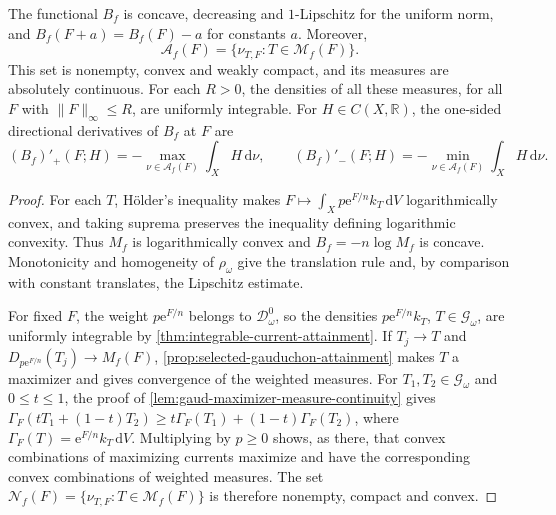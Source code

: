 \begin{proposition}\label{prop:integrable-threshold-adjoints}
The functional $B_f$ is concave, decreasing and $1$-Lipschitz for the uniform norm, and $B_f(F+a)=B_f(F)-a$ for constants $a$. Moreover,
\[
 \mathcal A_f(F)=\{\nu_{T,F}:T\in\mathscr M_f(F)\}.
\]
This set is nonempty, convex and weakly compact, and its measures are absolutely continuous. For each $R>0$, the densities of all these measures, for all $F$ with $\|F\|_\infty\leq R$, are uniformly integrable. For $H\in C(X,\mathbb R)$, the one-sided directional derivatives of $B_f$ at $F$ are
\[
 (B_f)'_+(F;H)=-\max_{\nu\in\mathcal A_f(F)}\int_XH\,\mathrm{d}\nu,
 \qquad
 (B_f)'_-(F;H)=-\min_{\nu\in\mathcal A_f(F)}\int_XH\,\mathrm{d}\nu.
\]
\end{proposition}
\begin{proof}
For each $T$, H\"older's inequality makes $F\mapsto\int_Xp \mathrm{e}^{F/n}k_T\,\mathrm{d}V$ logarithmically convex, and taking suprema preserves the inequality defining logarithmic convexity. Thus $M_f$ is logarithmically convex and $B_f=-n\log M_f$ is concave. Monotonicity and homogeneity of $\rho_\omega$ give the translation rule and, by comparison with constant translates, the Lipschitz estimate.

For fixed $F$, the weight $p\mathrm{e}^{F/n}$ belongs to $\mathcal D_\omega^0$, so the densities $p\mathrm{e}^{F/n}k_T$, $T\in\mathscr G_\omega$, are uniformly integrable by \cref{thm:integrable-current-attainment}. If $T_j\to T$ and $D_{p\mathrm{e}^{F/n}}(T_j)\to M_f(F)$, \cref{prop:selected-gauduchon-attainment} makes $T$ a maximizer and gives convergence of the weighted measures. For $T_1,T_2\in\mathscr G_\omega$ and $0\leq t\leq1$, the proof of \cref{lem:gaud-maximizer-measure-continuity} gives $\Gamma_F(tT_1+(1-t)T_2)\geq t\Gamma_F(T_1)+(1-t)\Gamma_F(T_2)$, where $\Gamma_F(T)=\mathrm e^{F/n}k_T\,\mathrm{d}V$. Multiplying by $p\geq0$ shows, as there, that convex combinations of maximizing currents maximize and have the corresponding convex combinations of weighted measures. The set $\mathscr N_f(F)=\{\nu_{T,F}:T\in\mathscr M_f(F)\}$ is therefore nonempty, compact and convex.


\end{proof}

